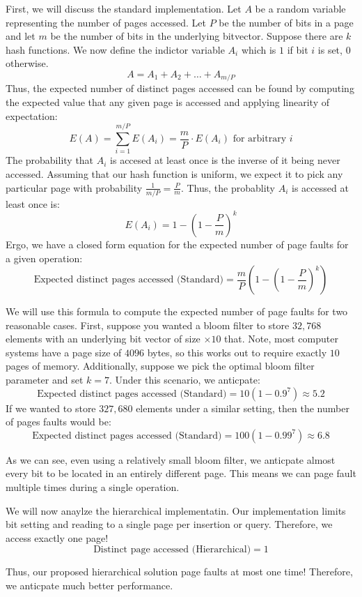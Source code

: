 First, we will discuss the standard implementation. Let $A$ be a random variable representing the number of pages accessed. 
Let $P$ be the number of bits in a page and let $m$ be the number of bits in the underlying bitvector.
Suppose there are $k$ hash functions.
We now define the indictor variable $A_i$ which is $1$ if bit $i$ is set, $0$ otherwise.
$$A = A_1 + A_2 + \ldots + A_{m/P}$$
Thus, the expected number of distinct pages accessed can be found by computing the expected value that any given page is accessed and applying linearity of expectation:
$$E(A) = \sum_{i=1}^{m/P} E(A_i) = \frac{m}{P} \cdot E(A_i) \text{ for arbitrary $i$}$$
The probability that $A_i$ is accesed at least once is the inverse of it being never accessed.
Assuming that our hash function is uniform, we expect it to pick any particular page with probability $\frac{1}{m/P} = \frac{P}{m}$.
Thus, the probablity $A_i$ is accessed at least once is:
$$E(A_i)  = 1 - (1 - \frac{P}{m})^k$$
Ergo, we have a closed form equation for the expected number of page faults for a given operation:
$$\text{Expected distinct pages accessed (Standard)} = \frac{m}{P} (1 - (1 - \frac{P}{m})^k)$$

We will use this formula to compute the expected number of page faults for two reasonable cases.
First, suppose you wanted a bloom filter to store $32,768$ elements with an underlying bit vector of size $\times 10$ that.
Note, most computer systems have a page size of $4096$ bytes, so this works out to require exactly $10$ pages of memory.
Additionally, suppose we pick the optimal bloom filter parameter and set $k=7$.
Under this scenario, we anticpate:
$$\text{Expected distinct pages accessed (Standard)} = 10(1-0.9^7) \approx 5.2$$
If we wanted to store $327,680$ elements under a similar setting, then the number of pages faults would be:
$$\text{Expected distinct pages accessed (Standard)} = 100(1-0.99^7) \approx 6.8$$

As we can see, even using a relatively small bloom filter, we anticpate almost every bit to be located in an entirely different page.
This means we can page fault multiple times during a single operation.

We will now anaylze the hierarchical implementatin. Our implementation limits bit setting and reading to a single page per insertion or query. Therefore, we access exactly one page!
$$\text{Distinct page accessed (Hierarchical)} = 1$$

Thus, our proposed hierarchical solution page faults at most one time!
Therefore, we anticpate much better performance.
